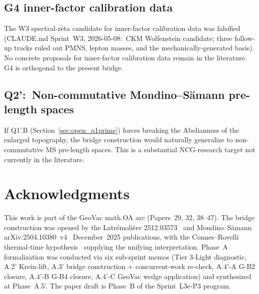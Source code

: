 \documentclass[11pt,a4paper]{article}
\theoremstyle{plain}
\theoremstyle{definition}
\begin{document}
\subsection{G4 inner-factor calibration data}\label{sec:g4}

The W3 spectral-zeta candidate for inner-factor calibration data was
falsified (CLAUDE.md Sprint~W3, 2026-05-08:\ CKM Wolfenstein
candidate; three follow-up tracks ruled out PMNS, lepton masses, and
the mechanically-generated basis). No concrete proposals for
inner-factor calibration data remain in the literature. G4 is
orthogonal to the present bridge.

\subsection{Q2':\ Non-commutative Mondino--S\"amann pre-length
spaces}\label{sec:q2_prime}

If Q1'.B (Section~\ref{sec:open_q1prime}) forces breaking the
Abelianness of the enlarged topography, the bridge construction would
naturally generalize to non-commutative MS pre-length spaces. This is
a substantial NCG-research target not currently in the literature.

\section*{Acknowledgments}

This work is part of the GeoVac math.OA arc (Papers~29, 32, 38--47).
The bridge construction was opened by the Latr\'emoli\`ere
2512.03573~\cite{latremoliere2025_hypertopology} and Mondino--S\"amann
arXiv:2504.10380~v4~\cite{mondino_samann2025_pointed} December~2025
publications, with the Connes--Rovelli thermal-time
hypothesis~\cite{connes_rovelli1994} supplying the unifying
interpretation. Phase~A formalization was conducted via six sub-sprint
memos (Tier 3-Light diagnostic, A.2' Krein-lift, A.3' bridge
construction + concurrent-work re-check, A.4'-A G-B2 closure, A.4'-B
G-B4 closure, A.4'-C GeoVac wedge application) and synthesized at
Phase~A.5'. The paper draft is Phase~B of the Sprint~L3e-P3 program.
\end{document}
